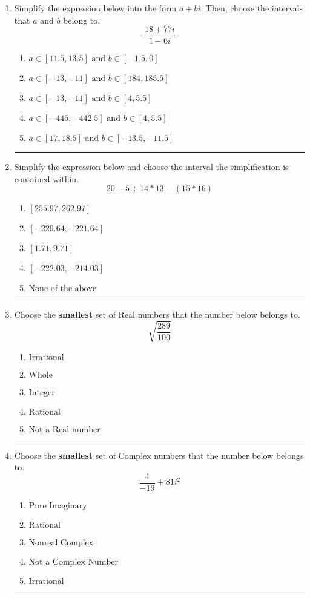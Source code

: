 \documentclass[14pt]{extbook}
\newcommand{\litem}[1]{\item#1\hspace*{-1cm}\rule{\textwidth}{0.4pt}}
\begin{document}
\begin{enumerate}
{\begin{enumerate}[label=\Alph*.]
\end{enumerate} }
\litem{
Simplify the expression below into the form $a+bi$. Then, choose the intervals that $a$ and $b$ belong to.\[ \frac{18 + 77 i}{1 - 6 i} \]\begin{enumerate}[label=\Alph*.]
\item \( a \in [11.5, 13.5] \text{ and } b \in [-1.5, 0] \)
\item \( a \in [-13, -11] \text{ and } b \in [184, 185.5] \)
\item \( a \in [-13, -11] \text{ and } b \in [4, 5.5] \)
\item \( a \in [-445, -442.5] \text{ and } b \in [4, 5.5] \)
\item \( a \in [17, 18.5] \text{ and } b \in [-13.5, -11.5] \)

\end{enumerate} }
\litem{
Simplify the expression below and choose the interval the simplification is contained within.\[ 20 - 5 \div 14 * 13 - (15 * 16) \]\begin{enumerate}[label=\Alph*.]
\item \( [255.97, 262.97] \)
\item \( [-229.64, -221.64] \)
\item \( [1.71, 9.71] \)
\item \( [-222.03, -214.03] \)
\item \( \text{None of the above} \)

\end{enumerate} }
\litem{
Choose the \textbf{smallest} set of Real numbers that the number below belongs to.\[ \sqrt{\frac{289}{100}} \]\begin{enumerate}[label=\Alph*.]
\item \( \text{Irrational} \)
\item \( \text{Whole} \)
\item \( \text{Integer} \)
\item \( \text{Rational} \)
\item \( \text{Not a Real number} \)

\end{enumerate} }
\litem{
Choose the \textbf{smallest} set of Complex numbers that the number below belongs to.\[ \frac{4}{-19}+81i^2 \]\begin{enumerate}[label=\Alph*.]
\item \( \text{Pure Imaginary} \)
\item \( \text{Rational} \)
\item \( \text{Nonreal Complex} \)
\item \( \text{Not a Complex Number} \)
\item \( \text{Irrational} \)


\end{enumerate}}
\end{enumerate}
\end{document}
